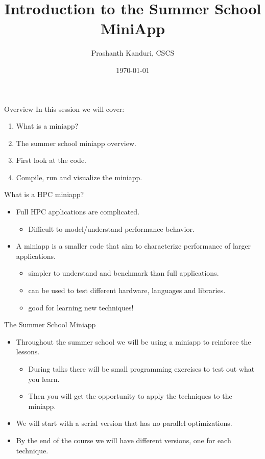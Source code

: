 \documentclass[aspectratio=43]{beamer}
\author{Prashanth Kanduri, CSCS}
\title{Introduction to the Summer School MiniApp}
\subtitle{}
\date{\today}
\begin{document}
\cscstitle

\begin{frame}[fragile]{Overview}
    In this session we will cover:
    \begin{enumerate}
        \item What is a miniapp?
        \item The summer school miniapp overview.
        \item First look at the code.
        \item Compile, run and visualize the miniapp.
    \end{enumerate}
\end{frame}

\begin{frame}[fragile]{What is a HPC miniapp?}
    \begin{itemize}
        \item Full HPC applications are complicated.
        \begin{itemize}
            \item Difficult to model/understand performance behavior.
        \end{itemize}
        \item A miniapp is a smaller code that aim to characterize performance of larger applications.
        \begin{itemize}
            \item simpler to understand and benchmark than full applications.
            \item can be used to test different hardware, languages and libraries.
            \item good for learning new techniques!
        \end{itemize}
    \end{itemize}
\end{frame}

\begin{frame}[fragile]{The Summer School Miniapp}
    \begin{itemize}
        \item Throughout the summer school we will be using a  miniapp to reinforce the lessons.
        \begin{itemize}
            \item During talks there will be small programming exercises to  test out what you learn.
            \item Then you will get the opportunity to apply the techniques  to the miniapp.
        \end{itemize}
        \item We will start with a serial version that has no parallel  optimizations.
        \item By the end of the course we will have different  versions, one for each technique.
    \end{itemize}
\end{frame}
\end{document}
